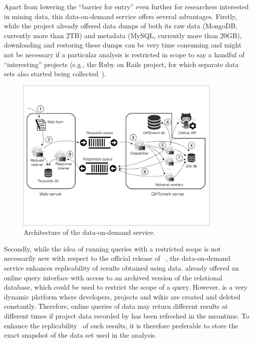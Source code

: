Apart from lowering the ``barrier for entry'' even further for researchers interested in mining \gh data,
this data-on-demand service offers several advantages.
Firstly, while the \ght project already offered data dumps of both its raw data (MongoDB, currently more than 2TB)
and metadata (MySQL, currently more than 20GB), downloading and restoring these dumps can be
very time consuming and might not be necessary if a particular analysis is restricted in scope to say a handful
of ``interesting'' \gh projects (e.g., the Ruby on Rails project, for which separate data sets also started being
collected~\cite{wagstrom2013network}).

\begin{figure}[t]
\begin{center}
\includegraphics[width=0.9\textwidth, trim=5 160 5 105, clip=True]{figures/architecture.pdf}
\caption{Architecture of the \ght data-on-demand service.}
\label{fig:architecture}
\end{center}
\end{figure}

Secondly, while the idea of running queries with a restricted scope is not necessarily new with respect to
the official release of \linebreak \ght~\cite{gousios2012ghtorent}, the data-on-demand service enhances replicability
of results obtained using \ght data.
\ght already offered an online query interface with access to an archived version of the relational database,
which could be used to restrict the scope of a query.
However, \gh is a very dynamic platform where developers, projects and wikis are created and deleted constantly.
Therefore, online queries of \ght data may return different results at different times if project data recorded
by \ght has been refreshed in the meantime.
To enhance the replicability~\cite{gonzalez2012reproducibility} of such results, it is therefore preferable to
store the exact snapshot of the data set used in the analysis.

